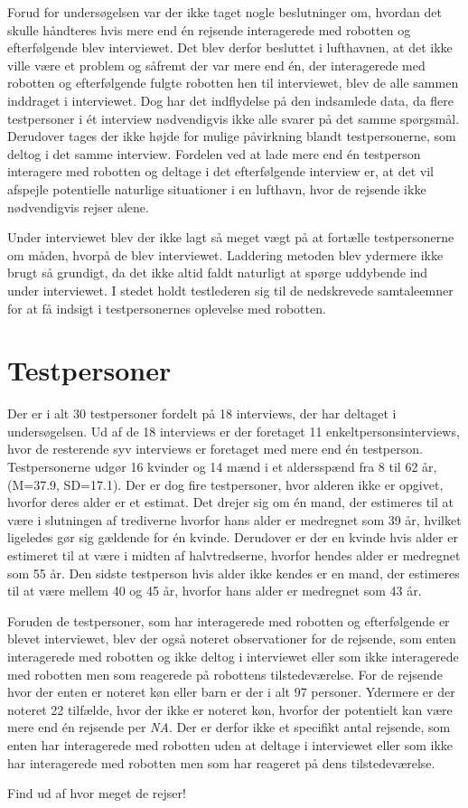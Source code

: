 Forud for undersøgelsen var der ikke taget nogle beslutninger om, hvordan det skulle håndteres hvis mere end én rejsende interagerede med robotten og efterfølgende blev interviewet. Det blev derfor besluttet i lufthavnen, at det ikke ville være et problem og såfremt der var mere end én, der interagerede med robotten og efterfølgende fulgte robotten hen til interviewet, blev de alle sammen inddraget i interviewet. Dog har det indflydelse på den indsamlede data, da flere testpersoner i ét interview nødvendigvis ikke alle svarer på det samme spørgsmål. Derudover tages der ikke højde for mulige påvirkning blandt testpersonerne, som deltog i det samme interview. Fordelen ved at lade mere end én testperson interagere med robotten og deltage i det efterfølgende interview er, at det vil afspejle potentielle naturlige situationer i en lufthavn, hvor de rejsende ikke nødvendigvis rejser alene.        

Under interviewet blev der ikke lagt så meget vægt på at fortælle testpersonerne om måden, hvorpå de blev interviewet. Laddering metoden blev ydermere ikke brugt så grundigt, da det ikke altid faldt naturligt at spørge uddybende ind under interviewet. I stedet holdt testlederen sig til de nedskrevede samtaleemner for at få indsigt i testpersonernes oplevelse med robotten.

\section{Testpersoner}
\label{ParametreTestpersoner}
%
Der er i alt 30 testpersoner fordelt på 18 interviews, der har deltaget i undersøgelsen. Ud af de 18 interviews er der foretaget 11 enkeltpersonsinterviews, hvor de resterende syv interviews er foretaget med mere end én testperson. Testpersonerne udgør 16 kvinder og 14 mænd i et aldersspænd fra 8 til 62 år, (M=37.9, SD=17.1). Der er dog fire testpersoner, hvor alderen ikke er opgivet, hvorfor deres alder er et estimat. Det drejer sig om én mand, der estimeres til at være i slutningen af trediverne hvorfor hans alder er medregnet som 39 år, hvilket ligeledes gør sig gældende for én kvinde. Derudover er der en kvinde hvis alder er estimeret til at være i midten af halvtredserne, hvorfor hendes alder er medregnet som 55 år. Den sidste testperson hvis alder ikke kendes er en mand, der estimeres til at være mellem 40 og 45 år, hvorfor hans alder er medregnet som 43 år. 

Foruden de testpersoner, som har interagerede med robotten og efterfølgende er blevet interviewet, blev der også noteret observationer for de rejsende, som enten interagerede med robotten og ikke deltog i interviewet eller som ikke interagerede med robotten men som reagerede på robottens tilstedeværelse. For de rejsende hvor der enten er noteret køn eller barn er der i alt 97 personer. Ydermere er der noteret 22 tilfælde, hvor der ikke er noteret køn, hvorfor der potentielt kan være mere end én rejsende per \textit{NA}. Der er derfor ikke et specifikt antal rejsende, som enten har interagerede med robotten uden at deltage i interviewet eller som ikke har interagerede med robotten men som har reageret på dens tilstedeværelse. \blankline 


Find ud af hvor meget de rejser! 
